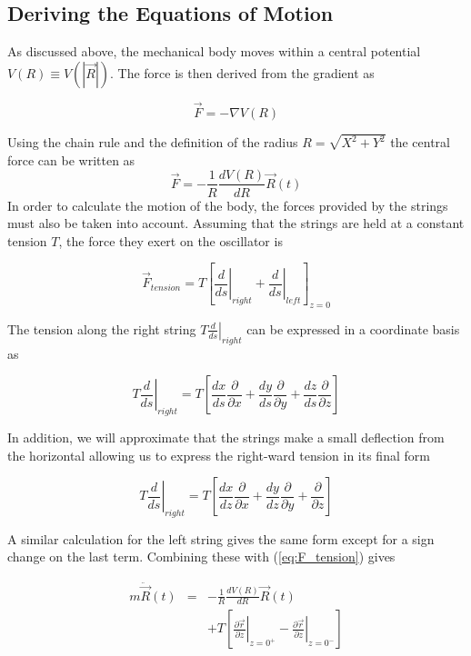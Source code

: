  
\subsection{Deriving the Equations of Motion}

As discussed above, the mechanical body moves within a central 
potential $V(R) \equiv V(|\vec R|)$.
The force is then derived from the gradient as

\[
	\vec F = - \nabla V( R )
\]

\noindent Using the chain rule and the definition of the radius 
$R = \sqrt{X^2 + Y^2}$ the central force can be written as 
\begin{equation}\label{eq:F_pot}
  \vec F = -\frac{1}{R} \frac{d V(R)}{d R} {\vec R}(t)
\end{equation}
In order to calculate the motion of the body, the forces provided 
by the strings must also be taken into account.  
Assuming that the strings are held at a constant tension $T$, 
the force they exert on the oscillator is

\begin{equation}\label{eq:F_tension}
   {\vec F}_{tension} = T \left[ \left.\frac{d}{ds} \right|_{right} + 
                          \left.\frac{d}{ds}  \right|_{left} \right]_{z=0}
\end{equation}

The tension along the right string $\left. T \frac{d}{ds} 
\right|_{right} $ can be expressed in a coordinate basis as 

\[
	\left. T \frac{d}{ds} \right|_{right}  = T \left[ 
			\frac{dx}{ds}\frac{\partial}{\partial x} +
		        \frac{dy}{ds}\frac{\partial}{\partial y} +
		        \frac{dz}{ds}\frac{\partial}{\partial z}
			\right]
\]

In addition, we will approximate that the strings make a small 
deflection from the horizontal allowing us to express the 
right-ward tension in its final form

\[
	\left. T \frac{d}{ds} \right|_{right}  = T \left[ 
			\frac{dx}{dz}\frac{\partial}{\partial x} +
		        \frac{dy}{dz}\frac{\partial}{\partial y} +
		        \frac{\partial}{\partial z}
			\right]
\]

A similar calculation for the left string gives the same form 
except for a sign change on the last term.  
Combining these with (\ref{eq:F_tension}) gives

\begin{eqnarray}\label{eq:mixed_motion}
 	m {\ddot {\vec R} }(t) & = & -\frac{1}{R} \frac{d V(R)}
	                            {d R} {\vec R}(t) \nonumber \\
			& & +  T 
			\left[ 
			\left. \frac{\partial \vec r}{\partial z} \right|_{z = 0^+} 
		     -  \left. \frac{\partial \vec r}{\partial z} \right|_{z = 0^-}
			\right]
\end{eqnarray}

